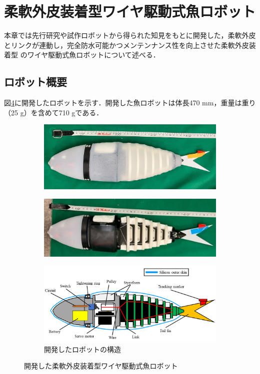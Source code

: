 \newpage

\section{柔軟外皮装着型ワイヤ駆動式魚ロボット}
本章では先行研究\cite{kyu}や試作ロボットから得られた知見をもとに開発した，柔軟外皮とリンクが連動し，完全防水可能かつメンテンナンス性を向上させた柔軟外皮装着型
のワイヤ駆動式魚ロボットについて述べる．
\subsection{ロボット概要}
図\ref{fig:gaikan}に開発したロボットを示す．開発した魚ロボットは体長470 mm，重量は重り（25 g）を含めて710 gである．
\begin{figure}[htbp]
    \centering  
    \begin{subfigure}[b]{0.85\linewidth}
        \centering
        \includegraphics[width=0.9\linewidth]{chapters/picture/withskin.jpg}
        \label{fig:fishrobo_with}
    \end{subfigure}
    \begin{subfigure}[b]{0.85\linewidth}
        \centering
        \includegraphics[width=0.9\linewidth]{chapters/picture/without_skin.jpg}
        \label{fig:fishrobo_less}
    \end{subfigure}
    \begin{subfigure}[b]{0.85\linewidth}
        \centering
        \includegraphics[width=0.9\linewidth]{chapters/picture/fish.png}
        \caption{開発したロボットの構造}
        \label{fig:kouzou}
    \end{subfigure}
    \caption{開発した柔軟外皮装着型ワイヤ駆動式魚ロボット}
    \label{fig:gaikan}
\end{figure}
